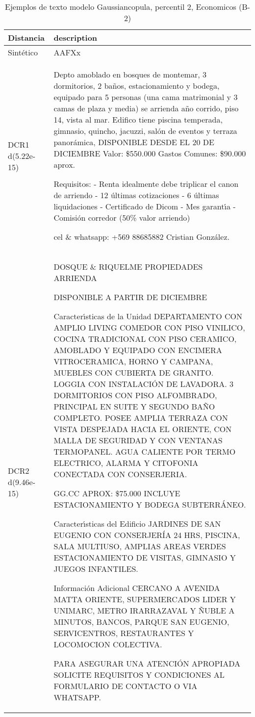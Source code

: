 \begin{table}[H]
\centering
\fontsize{10}{14}\selectfont
\caption{Ejemplos de texto modelo Gaussiancopula, percentil 2, Economicos (B-2)}
\label{table-example-economicos-b-2-gaussiancopula-2p-text}
\begin{tabular}{|l|m{35em}|}
\hline
\rowcolor[gray]{0.8}
Distancia & description \\
\hline Sintético & AAFXx \\
\hline DCR1 d(5.22e-15) & Depto amoblado en bosques de montemar, 3 dormitorios, 2 ba\~nos, estacionamiento y bodega, equipado para 5 personas (una cama matrimonial y 3 camas de plaza y media) se arrienda a\~no corrido, piso 14, vista al mar.
Edifico tiene piscina temperada, gimnasio, quincho, jacuzzi, sal\'on de eventos y terraza panor\'amica, 
DISPONIBLE DESDE EL 20 DE DICIEMBRE
Valor: \$550.000
Gastos Comunes: \$90.000 aprox.

Requisitos:
- Renta idealmente debe triplicar el canon de arriendo 
- 12 \'ultimas cotizaciones
- 6 \'ultimas liquidaciones
- Certificado de Dicom
- Mes garant{\'\i}a
- Comisi\'on corredor (50\% valor arriendo)

cel \& whatsapp: +569 88685882
Cristian Gonz\'alez.
 \\
\hline DCR2 d(9.46e-15) & DOSQUE \& RIQUELME PROPIEDADES ARRIENDA

DISPONIBLE A PARTIR DE DICIEMBRE

Caracter{\'\i}sticas de la Unidad
DEPARTAMENTO CON AMPLIO LIVING COMEDOR CON PISO VINILICO, COCINA TRADICIONAL CON PISO CERAMICO, AMOBLADO Y EQUIPADO CON ENCIMERA VITROCERAMICA, HORNO Y CAMPANA, MUEBLES CON CUBIERTA DE GRANITO. LOGGIA CON INSTALACI\'ON DE LAVADORA. 3 DORMITORIOS CON PISO ALFOMBRADO, PRINCIPAL EN SUITE Y SEGUNDO BA\~NO COMPLETO. POSEE AMPLIA TERRAZA CON VISTA DESPEJADA HACIA EL ORIENTE, CON MALLA DE SEGURIDAD Y CON VENTANAS TERMOPANEL. AGUA CALIENTE POR TERMO ELECTRICO, ALARMA Y CITOFONIA CONECTADA CON CONSERJERIA.

GG.CC APROX: \$75.000
INCLUYE ESTACIONAMIENTO Y BODEGA SUBTERR\'ANEO.

Caracter{\'\i}sticas del Edificio
JARDINES DE SAN EUGENIO CON CONSERJER\'IA 24 HRS, PISCINA, SALA MULTIUSO, AMPLIAS AREAS VERDES ESTACIONAMIENTO DE VISITAS, GIMNASIO Y JUEGOS INFANTILES.

Informaci\'on Adicional
CERCANO A AVENIDA MATTA ORIENTE, SUPERMERCADOS LIDER Y UNIMARC, METRO IRARRAZAVAL Y \~NUBLE A MINUTOS, BANCOS, PARQUE SAN EUGENIO, SERVICENTROS, RESTAURANTES Y LOCOMOCION COLECTIVA.

PARA ASEGURAR UNA ATENCI\'ON APROPIADA SOLICITE REQUISITOS Y CONDICIONES AL FORMULARIO DE CONTACTO O VIA WHATSAPP.  
 \\
\hline
\end{tabular}
\end{table}
